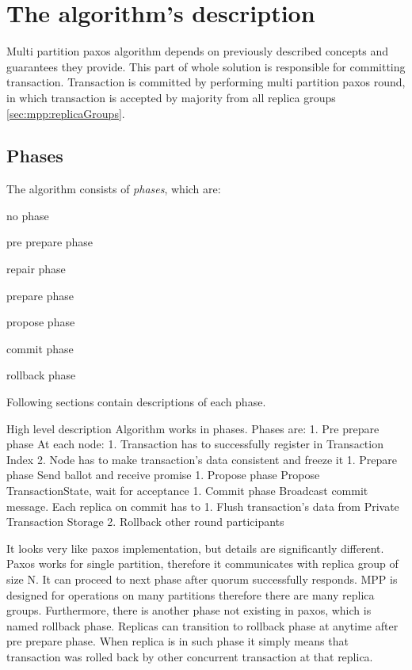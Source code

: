 \section{The algorithm's description}
Multi partition paxos algorithm depends on previously described concepts and guarantees they provide. This part of whole solution is responsible for committing transaction. Transaction is committed by performing multi partition paxos round, in which transaction is accepted by majority from all replica groups \ref{sec:mpp:replicaGroups}. 

\subsection{Phases}
The algorithm consists of \emph{phases}, which are: 
\begin{enumerate*}
\item no phase
\item pre prepare phase
\item repair phase
\item prepare phase
\item propose phase
\item commit phase
\item rollback phase
\end{enumerate*}
Following sections contain descriptions of each phase.



        High level description
Algorithm works in phases. Phases are:
1. Pre prepare phase
At each node:
   1. Transaction has to successfully register in Transaction Index
   2. Node has to make transaction’s data consistent and freeze it
1. Prepare phase
Send ballot and receive promise
1. Propose phase
Propose TransactionState, wait for acceptance
1. Commit phase
        Broadcast commit message. Each replica on commit has to
   1. Flush transaction’s data from Private Transaction Storage
   2. Rollback other round participants
        
It looks very like paxos implementation, but details are significantly different. 
Paxos works for single partition, therefore it communicates with replica group of size N. It can proceed to next phase after quorum successfully responds. 
MPP is designed for operations on many partitions therefore there are many replica groups. 
Furthermore, there is another phase not existing in paxos, which is named rollback phase. Replicas can transition to rollback phase at anytime after pre prepare phase. When replica is in such phase it simply means that transaction was rolled back by other concurrent transaction at that replica. 


